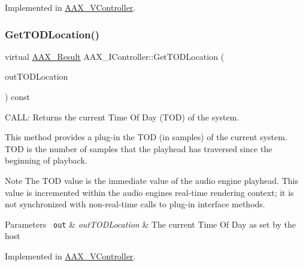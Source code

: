 Implemented in \mbox{\hyperlink{a01905_aa3a0f0060f70e8167634daf6beadeae5}{A\+A\+X\+\_\+\+V\+Controller}}.

\mbox{\label{a01789_afbc2973d755b6c3ae82b6c8461e9fdee}} 
\subsubsection{\texorpdfstring{GetTODLocation()}{GetTODLocation()}}
{\footnotesize\ttfamily virtual \mbox{\hyperlink{a00392_a4d8f69a697df7f70c3a8e9b8ee130d2f}{A\+A\+X\+\_\+\+Result}} A\+A\+X\+\_\+\+I\+Controller\+::\+Get\+T\+O\+D\+Location (\begin{DoxyParamCaption}\item[{\mbox{\hyperlink{a00392_a46542a1dcccdcc3b4260a9926edf8a2a}{A\+A\+X\+\_\+\+C\+Time\+Of\+Day}} $\ast$}]{out\+T\+O\+D\+Location }\end{DoxyParamCaption}) const\hspace{0.3cm}{\ttfamily [pure virtual]}}



C\+A\+LL\+: Returns the current Time Of Day (T\+OD) of the system. 

This method provides a plug-\/in the T\+OD (in samples) of the current system. T\+OD is the number of samples that the playhead has traversed since the beginning of playback.

\begin{DoxyNote}{Note}
The T\+OD value is the immediate value of the audio engine playhead. This value is incremented within the audio engine\textquotesingle{}s real-\/time rendering context; it is not synchronized with non-\/real-\/time calls to plug-\/in interface methods.
\end{DoxyNote}

\begin{DoxyParams}[1]{Parameters}
\mbox{\texttt{ out}}  & {\em out\+T\+O\+D\+Location} & The current Time Of Day as set by the host \\
\hline
\end{DoxyParams}


Implemented in \mbox{\hyperlink{a01905_a9ae44bc7589edb872e8194099b575afd}{A\+A\+X\+\_\+\+V\+Controller}}.

\mbox{\label{a01789_af2c648879419d94971c1308d8698601f}} 
